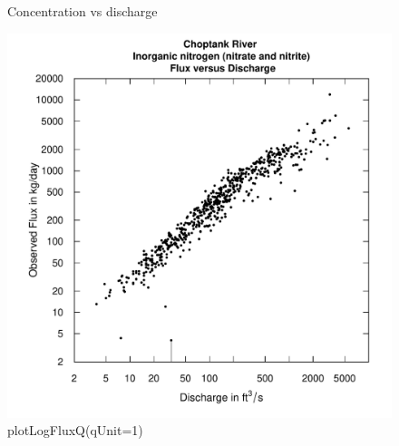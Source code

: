 \documentclass[a4paper,11pt]{article}\usepackage{graphicx, color}
\newenvironment{knitrout}{}{} %
\begin{document}
\begin{knitrout}
\color{fgcolor}\begin{figure}[]
\caption[Concentration vs discharge]{Concentration vs discharge\label{fig:plotConcQ}}
\end{figure}


\end{knitrout}


\begin{knitrout}
\color{fgcolor}\begin{figure}[]

\includegraphics[width=.5\linewidth,height=.5\linewidth]{figure/plotLogConcQ} \caption[plotLogFluxQ(qUnit=1)]{plotLogFluxQ(qUnit=1)\label{fig:plotLogConcQ}}
\end{figure}


\end{knitrout}
\end{document}
